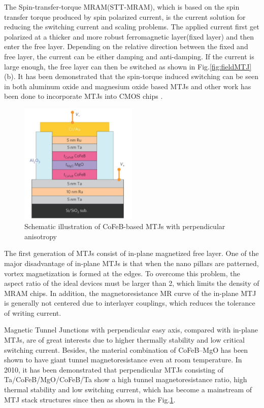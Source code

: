 The Spin-transfer-torque MRAM(STT-MRAM), which is based on the spin transfer torque produced by spin polarized current, is the current solution for reducing the switching current and scaling problems. The applied current first get polarized at a thicker and more robust ferromagnetic layer(fixed layer) and then enter the free layer. Depending on the relative direction between the fixed and free layer, the current can be either damping and anti-damping. If the current is large enough, the free layer can then be switched as shown in Fig.\ref{fig:fieldMTJ}(b).  It has been demonstrated that the spin-torque induced switching can be seen in both aluminum oxide and magnesium oxide based MTJs\cite{STTSwitchingMTJ1}\cite{STTSwitchingMTJ2} and other work has been done to incorporate MTJs into CMOS chips\cite{MTJIBM} \cite{MTJIBM2}\cite{MRAMMTJs}.


\begin{figure}[h!]
\centering
\includegraphics[width=0.5\textwidth]{fig/MTJ/MTJStack}
\caption{ Schematic illustration of CoFeB-based MTJs with perpendicular anisotropy}
\label{fig:MTJStack}
\end{figure}



The first generation of MTJs consist of in-plane magnetized free layer. One of the major disadvantage of in-plane MTJs is that when the nano pillars are patterned, vortex magnetization is formed at the edges\cite{vortex1}\cite{vortex2}. To overcome this problem, the aspect ratio of the ideal devices must be larger than 2\cite{vortex3}, which limits the density of MRAM chips. In addition, the magnetoresistance  MR  curve of the in-plane MTJ is generally not centered due to interlayer couplings\cite{inplaneswitching}, which reduces the tolerance of writing current.


Magnetic Tunnel Junctions with perpendicular easy axis, compared with in-plane MTJs, are of great interests due to higher thermally stability and low critical switching current\cite{PMA1}\cite{PMA3}\cite{PMA2}. Besides, the material combination of CoFeB–MgO has been shown to have giant tunnel magnetoresistance even at room temperature\cite{GiantTMR}\cite{GiantTMR2}\cite{GiantTMR3}. In 2010, it has been demonstrated that perpendicular MTJs consisting of Ta/CoFeB/MgO/CoFeB/Ta show a high tunnel magnetoresistance ratio, high thermal stability and low switching current\cite{MTJPMA}, which has become a mainstream of MTJ stack structures since then as shown in the Fig.\ref{fig:MTJStack}.

